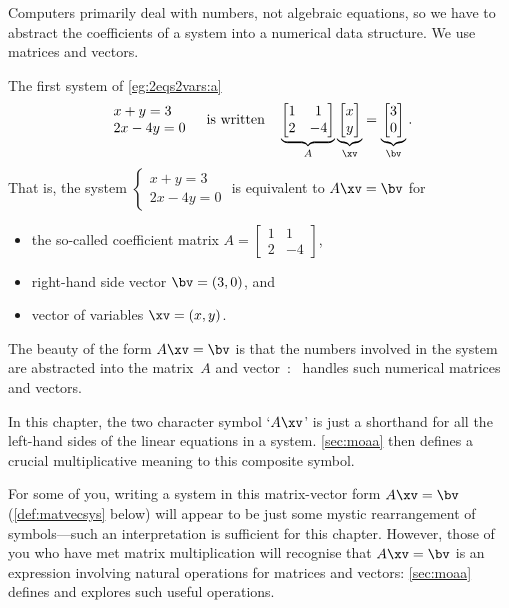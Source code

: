Computers primarily deal with numbers, not algebraic equations, so we have to abstract the coefficients of a system into a numerical data structure.
We use matrices and vectors.
\begin{example} \label{eg:}
The first system of \autoref{eg:2eqs2vars:a}
\begin{equation*}
\begin{array}{l} x+y=3\\2x-4y=0 \end{array}
\quad\text{is written}\quad
\underbrace{\begin{bmatrix} 1&1\\2&-4 \end{bmatrix}}_A
\underbrace{\begin{bmatrix} x\\y \end{bmatrix}}_\xv
=\underbrace{\begin{bmatrix} 3\\0 \end{bmatrix}}_\bv .
\end{equation*}
That is, the system \(\begin{cases} x+y=3\\2x-4y=0 \end{cases}\)
is equivalent to \(A\xv=\bv\) for
\begin{itemize}
\item the so-called coefficient matrix \(A=\begin{bmatrix} 1&1\\2&-4 \end{bmatrix}\), 
\item right-hand side vector \(\bv=(3,0)\), and 
\item vector of variables \(\xv=(x,y)\).
\end{itemize}

\end{example}


The beauty of the form \(A\xv=\bv\) is that the numbers involved in the system are abstracted into the matrix~\(A\) and vector~\bv: \script\ handles such numerical matrices and vectors.
\begin{aside}
In this chapter, the two character symbol `\(A\xv\)' is just a shorthand for all the left-hand sides of the linear equations in a system.
\autoref{sec:moaa} then defines a crucial multiplicative meaning to this composite symbol. 
\end{aside}%
For some of you, writing a system in this matrix-vector form \(A\xv=\bv\) (\autoref{def:matvecsys} below) will appear to be just some mystic rearrangement of symbols---such an interpretation is sufficient for this chapter.
However, those of you who have met matrix multiplication will recognise that \(A\xv=\bv\) is an expression involving natural operations for matrices and vectors: \autoref{sec:moaa} defines and explores such useful operations.

